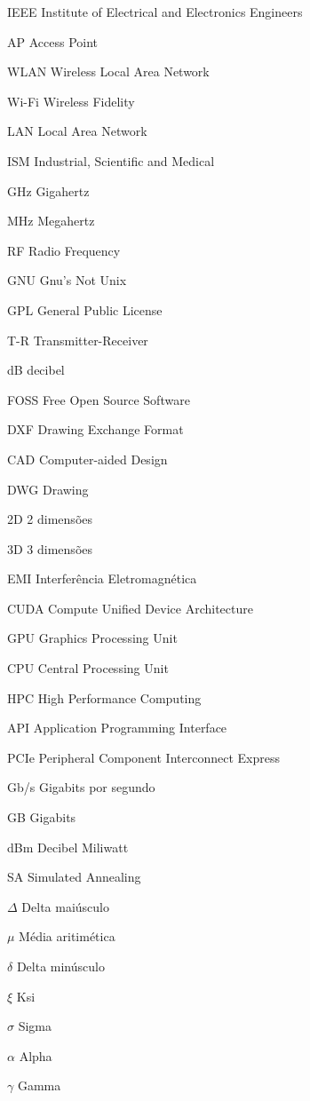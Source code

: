 \documentclass[
	12pt,				%
	openright,			%
	twoside,			%
	a4paper,			%
	english,			%
	french,				%
	spanish,			%
	brazil				%
	]{abntex2}
\begin{document}
\begin{siglas}
  \item[IEEE] Institute of Electrical and Electronics Engineers
  \item[AP] Access Point
  \item[WLAN] Wireless Local Area Network
  \item[Wi-Fi] Wireless Fidelity
  \item[LAN] Local Area Network
  \item[ISM] Industrial, Scientific and Medical
  \item[GHz] Gigahertz
  \item[MHz] Megahertz
  \item[RF] Radio Frequency
  \item[GNU] Gnu's Not Unix
  \item[GPL] General Public License
  \item[T-R] Transmitter-Receiver
  \item[dB] decibel
  \item[FOSS] Free Open Source Software
  \item[DXF] Drawing Exchange Format
  \item[CAD] Computer-aided Design
  \item[DWG] Drawing
  \item[2D] 2 dimensões
  \item[3D] 3 dimensões
  \item[EMI] Interferência Eletromagnética
  \item[CUDA] Compute Unified Device Architecture
  \item[GPU] Graphics Processing Unit
  \item[CPU] Central Processing Unit
  \item[HPC] High Performance Computing
  \item[API] Application Programming Interface
  \item[PCIe] Peripheral Component Interconnect Express
  \item[Gb/s] Gigabits por segundo
  \item[GB] Gigabits
  \item[dBm] Decibel Miliwatt
  \item[SA] Simulated Annealing
\end{siglas}

\begin{simbolos}
  \item[$ \Delta $] Delta maiúsculo
  \item[$ \mu $] Média aritimética
  \item[$ \delta $] Delta minúsculo
  \item[$ \xi $] Ksi
  \item[$ \sigma $] Sigma
  \item[$ \alpha $] Alpha
  \item[$ \gamma $] Gamma
\end{simbolos}
\end{document}
